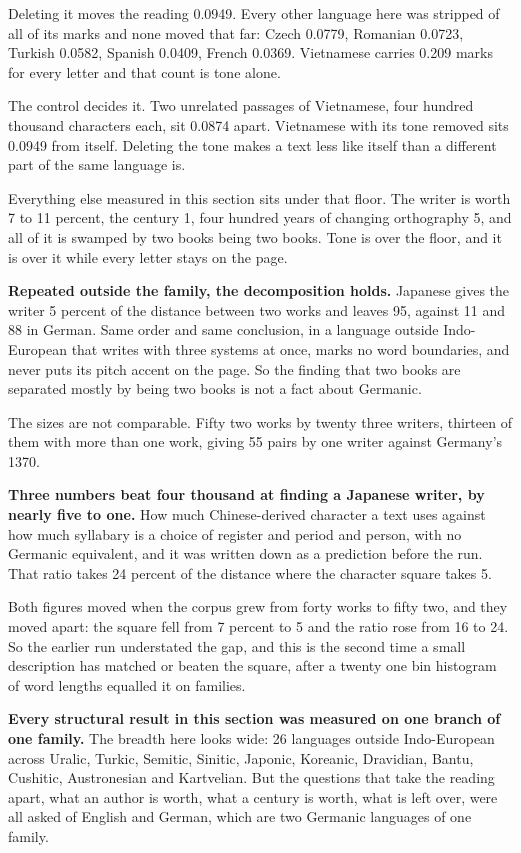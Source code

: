 Deleting it moves the reading 0.0949. Every other language here was stripped of all of its marks and none moved that far: Czech 0.0779, Romanian 0.0723, Turkish 0.0582, Spanish 0.0409, French 0.0369. Vietnamese carries 0.209 marks for every letter and that count is tone alone.

The control decides it. Two unrelated passages of Vietnamese, four hundred thousand characters each, sit 0.0874 apart. Vietnamese with its tone removed sits 0.0949 from itself. Deleting the tone makes a text less like itself than a different part of the same language is.

Everything else measured in this section sits under that floor. The writer is worth 7 to 11 percent, the century 1, four hundred years of changing orthography 5, and all of it is swamped by two books being two books. Tone is over the floor, and it is over it while every letter stays on the page.

\textbf{Repeated outside the family, the decomposition holds.} Japanese gives the writer 5 percent of the distance between two works and leaves 95, against 11 and 88 in German. Same order and same conclusion, in a language outside Indo-European that writes with three systems at once, marks no word boundaries, and never puts its pitch accent on the page. So the finding that two books are separated mostly by being two books is not a fact about Germanic.

The sizes are not comparable. Fifty two works by twenty three writers, thirteen of them with more than one work, giving 55 pairs by one writer against Germany's 1370.

\textbf{Three numbers beat four thousand at finding a Japanese writer, by nearly five to one.} How much Chinese-derived character a text uses against how much syllabary is a choice of register and period and person, with no Germanic equivalent, and it was written down as a prediction before the run. That ratio takes 24 percent of the distance where the character square takes 5.

Both figures moved when the corpus grew from forty works to fifty two, and they moved apart: the square fell from 7 percent to 5 and the ratio rose from 16 to 24. So the earlier run understated the gap, and this is the second time a small description has matched or beaten the square, after a twenty one bin histogram of word lengths equalled it on families.

\textbf{Every structural result in this section was measured on one branch of one family.} The breadth here looks wide: 26 languages outside Indo-European across Uralic, Turkic, Semitic, Sinitic, Japonic, Koreanic, Dravidian, Bantu, Cushitic, Austronesian and Kartvelian. But the questions that take the reading apart, what an author is worth, what a century is worth, what is left over, were all asked of English and German, which are two Germanic languages of one family.

